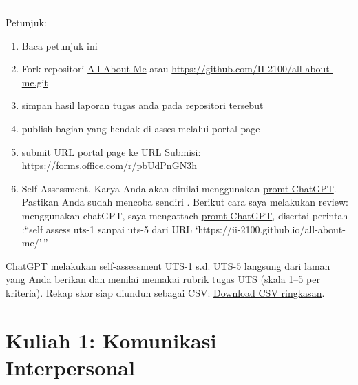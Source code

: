 \documentclass[
  letterpaper,
  DIV=11,
  numbers=noendperiod]{scrreprt}
\begin{document}
\begin{center}\rule{0.5\linewidth}{0.5pt}\end{center}

\begin{tcolorbox}[enhanced jigsaw, opacityback=0, leftrule=.75mm, colbacktitle=quarto-callout-important-color!10!white, bottomrule=.15mm, toprule=.15mm, toptitle=1mm, colframe=quarto-callout-important-color-frame, coltitle=black, bottomtitle=1mm, left=2mm, rightrule=.15mm, colback=white, breakable, titlerule=0mm, title=\textcolor{quarto-callout-important-color}{\faExclamation}\hspace{0.5em}{Important}, arc=.35mm, opacitybacktitle=0.6]

Petunjuk:

\begin{enumerate}
\def\labelenumi{\arabic{enumi}.}
\item
  Baca petunjuk ini
\item
  Fork repositori \href{https://github.com/II-2100/all-about-me.git}{All
  About Me} atau \url{https://github.com/II-2100/all-about-me.git}
\item
  simpan hasil laporan tugas anda pada repositori tersebut
\item
  publish bagian yang hendak di asses melalui portal page
\item
  submit URL portal page ke URL Submisi:
  \url{https://forms.office.com/r/pbUdPnGN3h}
\item
  Self Assessment. Karya Anda akan dinilai menggunakan
  \href{asesmen/skor_uts.pdf}{promt ChatGPT}. Pastikan Anda sudah
  mencoba sendiri . Berikut cara saya melakukan review: menggunakan
  chatGPT, saya mengattach \href{asesmen/skor_uts.pdf}{promt ChatGPT},
  disertai perintah :``self assess uts-1 sanpai uts-5 dari URL
  `https://ii-2100.github.io/all-about-me/'\,''
\end{enumerate}

ChatGPT melakukan self-assessment UTS-1 s.d. UTS-5 langsung dari laman
yang Anda berikan dan menilai memakai rubrik tugas UTS (skala 1--5 per
kriteria). Rekap skor siap diunduh sebagai CSV:
\href{sandbox:/mnt/data/UTS_self_assessment.csv}{Download CSV
ringkasan}.

\end{tcolorbox}


\chapter{Kuliah 1: Komunikasi
Interpersonal}\label{kuliah-1-komunikasi-interpersonal}
\end{document}

